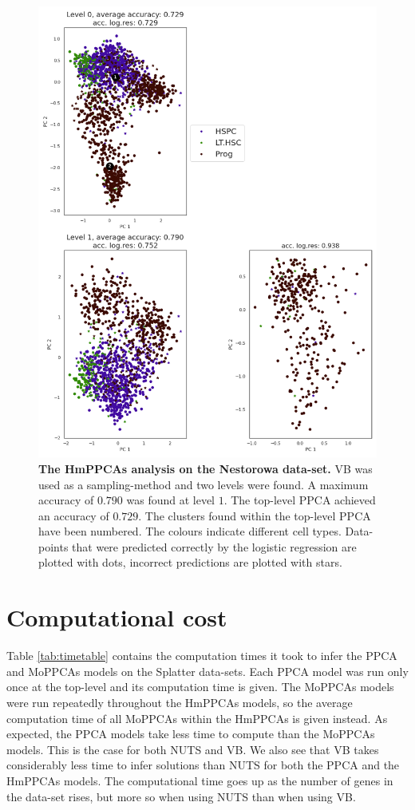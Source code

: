 \begin{figure}
    \centering
    \includegraphics[width=.7\linewidth]{figs/Nestorowa_tree_VB.png}
    \caption[The hmPPCAs analysis on the Nestorowa data-set.]{\small \textbf{The HmPPCAs analysis on the Nestorowa data-set.} \small VB was used as a sampling-method and two levels were found. A maximum accuracy of $0.790$ was found at level $1$. The top-level PPCA achieved an accuracy of $0.729$. The clusters found within the top-level PPCA have been numbered. The colours indicate different cell types. Data-points that were predicted correctly by the logistic regression are plotted with dots, incorrect predictions are plotted with stars.}
    \label{fig:nestorowa_vb}
\end{figure}



\section{Computational cost}
Table \ref{tab:timetable} contains the computation times it took to infer the PPCA and MoPPCAs models on the Splatter data-sets. Each PPCA model was run only once at the top-level and its computation time is given. The MoPPCAs models were run repeatedly throughout the HmPPCAs models, so the average computation time of all MoPPCAs within the HmPPCAs is given instead. As expected, the PPCA models take less time to compute than the MoPPCAs models. This is the case for both NUTS and VB. We also see that VB takes considerably less time to infer solutions than NUTS for both the PPCA and the HmPPCAs models. The computational time goes up as the number of genes in the data-set rises, but more so when using NUTS than when using VB.

